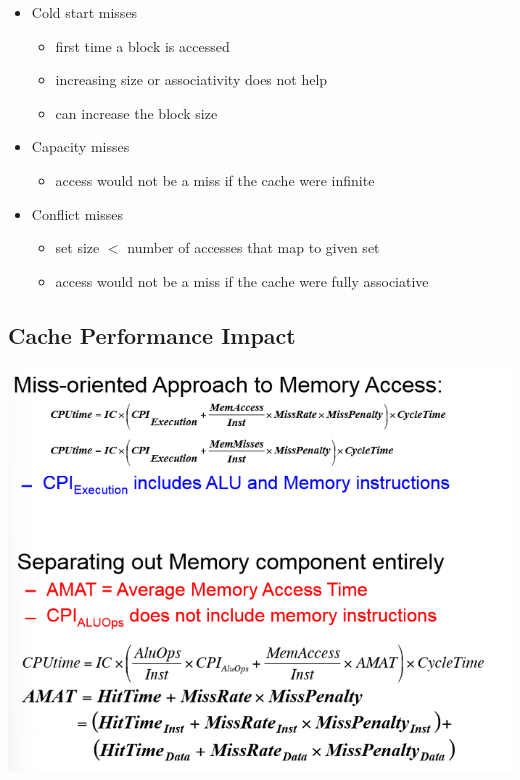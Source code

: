 \documentclass[letterpaper,12pt]{article}
\begin{document}
\begin{itemize}
    \item Cold start misses
          \begin{itemize}
              \item first time a block is accessed
              \item increasing size or associativity does not help
              \item can increase the block size
          \end{itemize}
    \item Capacity misses
          \begin{itemize}
              \item access would not be a miss if the cache were infinite
          \end{itemize}
    \item Conflict misses
          \begin{itemize}
              \item set size $<$ number of accesses that map to given set
              \item access would not be a miss if the cache were fully associative
          \end{itemize}
\end{itemize}

\subsection{Cache Performance Impact}

\includegraphics*{./Image/Cache Performance Impact.png}
\end{document}
